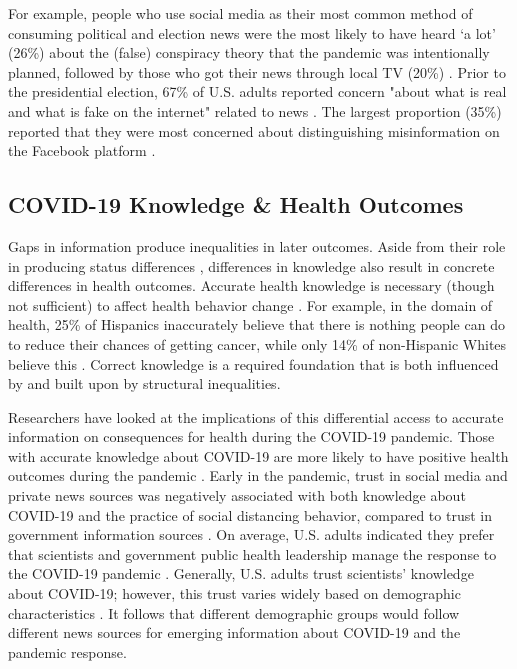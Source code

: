 \documentclass[11pt]{article}
\begin{document}
For example, people who use social media as their most common method of consuming political and election news were the most likely to have heard `a lot' (26\%) about the (false) conspiracy theory that the pandemic was intentionally planned, followed by those who got their news through local TV (20\%) \citep{Mitchell2020a}. Prior to the presidential election, 67\% of U.S. adults reported concern "about what is real and what is fake on the internet" related to news \citep[18]{Reuters2020}. The largest proportion (35\%) reported that they were most concerned about distinguishing misinformation on the Facebook platform \citep[19]{Reuters2020}.




\subsection{COVID-19 Knowledge \& Health Outcomes}

Gaps in information produce inequalities in later outcomes. Aside from their role in producing status differences \citep{Ridgeway2014}, differences in knowledge also result in concrete differences in health outcomes. Accurate health knowledge is necessary (though not sufficient) to affect health behavior change \citep{hints11}. For example, in the domain of health, 25\% of Hispanics inaccurately believe that there is nothing people can do to reduce their chances of getting cancer, while only 14\% of non-Hispanic Whites believe this \citep{hints11}. Correct knowledge is a required foundation that is both influenced by and built upon by structural inequalities.

Researchers have looked at the implications of this differential access to accurate information on consequences for health during the COVID-19 pandemic. Those with accurate knowledge about COVID-19 are more likely to have positive health outcomes during the pandemic \citep{Fridman2020}. Early in the pandemic, trust in social media and private news sources was negatively associated with both knowledge about COVID-19 and the practice of social distancing behavior, compared to trust in government information sources \citep{Fridman2020}. On average, U.S. adults indicated they prefer that scientists and government public health leadership manage the response to the COVID-19 pandemic \citep{McFadden2020}. Generally, U.S. adults trust scientists' knowledge about COVID-19; however, this trust varies widely based on demographic characteristics \citep{Evans2020}. It follows that different demographic groups would follow different news sources for emerging information about COVID-19 and the pandemic response.
\end{document}
